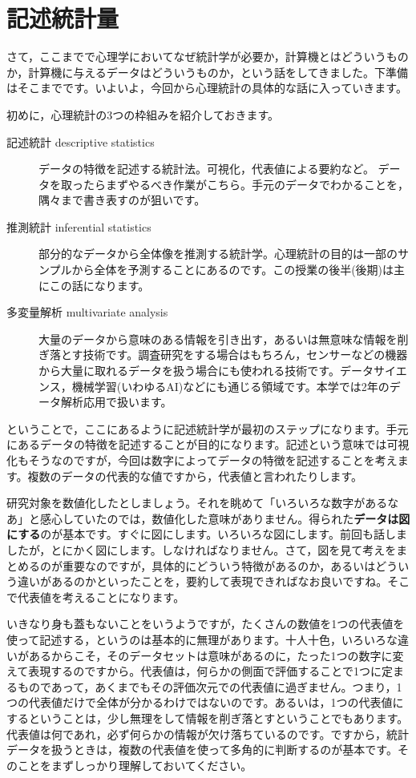 \documentclass{ltjbook}
\begin{document}
\VerbatimFootnotes
\chapter{記述統計量}
\label{m05_descriptives}

さて，ここまでで心理学においてなぜ統計学が必要か，計算機とはどういうものか，計算機に与えるデータはどういうものか，という話をしてきました。下準備はそこまでです。いよいよ，今回から心理統計の具体的な話に入っていきます。

初めに，心理統計の3つの枠組みを紹介しておきます。
\begin{description}
	\item[記述統計 descriptive statistics] データの特徴を記述する統計法。可視化，代表値による要約など。 データを取ったらまずやるべき作業がこちら。手元のデータでわかることを，隅々まで書き表すのが狙いです。
	\item[推測統計 inferential statistics] 部分的なデータから全体像を推測する統計学。心理統計の目的は一部のサンプルから全体を予測することにあるのです。この授業の後半(後期)は主にこの話になります。
	\item[多変量解析 multivariate analysis] 大量のデータから意味のある情報を引き出す，あるいは無意味な情報を削ぎ落とす技術です。調査研究をする場合はもちろん，センサーなどの機器から大量に取れるデータを扱う場合にも使われる技術です。データサイエンス，機械学習(いわゆるAI)などにも通じる領域です。本学では2年のデータ解析応用で扱います。
\end{description}

ということで，ここにあるように記述統計学が最初のステップになります。手元にあるデータの特徴を記述することが目的になります。記述という意味では可視化もそうなのですが，今回は数字によってデータの特徴を記述することを考えます。複数のデータの代表的な値ですから，代表値と言われたりします。

研究対象を数値化したとしましょう。それを眺めて「いろいろな数字があるなあ」と感心していたのでは，数値化した意味がありません。得られた\textbf{データは図にする}のが基本です。すぐに図にします。いろいろな図にします。前回も話しましたが，とにかく図にします。しなければなりません。さて，図を見て考えをまとめるのが重要なのですが，具体的にどういう特徴があるのか，あるいはどういう違いがあるのかといったことを，要約して表現できればなお良いですね。そこで代表値を考えることになります。

いきなり身も蓋もないことをいうようですが，たくさんの数値を1つの代表値を使って記述する，というのは基本的に無理があります。十人十色，いろいろな違いがあるからこそ，そのデータセットは意味があるのに，たった1つの数字に変えて表現するのですから。代表値は，何らかの側面で評価することで1つに定まるものであって，あくまでもその評価次元での代表値に過ぎません。つまり，1つの代表値だけで全体が分かるわけではないのです。あるいは，1つの代表値にするということは，少し無理をして情報を削ぎ落とすということでもあります。代表値は何であれ，必ず何らかの情報が欠け落ちているのです。ですから，統計データを扱うときは，複数の代表値を使って多角的に判断するのが基本です。そのことをまずしっかり理解しておいてください。
\end{document}

